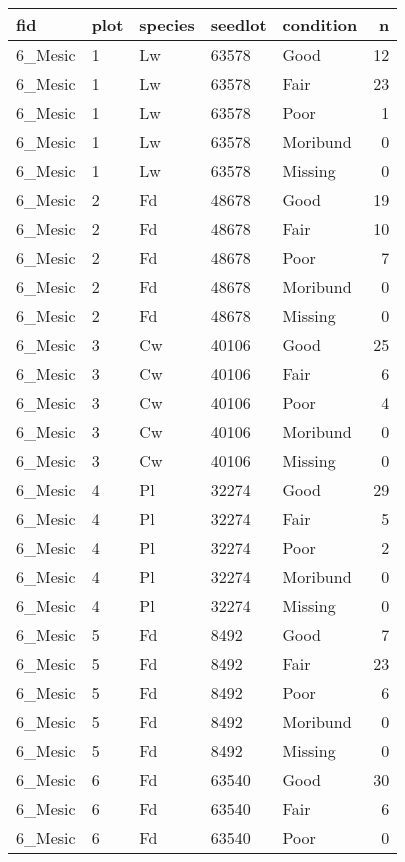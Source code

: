 \documentclass[
]{article}
\begin{document}
\begin{tabular}{l|l|l|l|l|r}
\hline
fid & plot & species & seedlot & condition & n\\
\hline
6\_Mesic & 1 & Lw & 63578 & Good & 12\\
\hline
6\_Mesic & 1 & Lw & 63578 & Fair & 23\\
\hline
6\_Mesic & 1 & Lw & 63578 & Poor & 1\\
\hline
6\_Mesic & 1 & Lw & 63578 & Moribund & 0\\
\hline
6\_Mesic & 1 & Lw & 63578 & Missing & 0\\
\hline
6\_Mesic & 2 & Fd & 48678 & Good & 19\\
\hline
6\_Mesic & 2 & Fd & 48678 & Fair & 10\\
\hline
6\_Mesic & 2 & Fd & 48678 & Poor & 7\\
\hline
6\_Mesic & 2 & Fd & 48678 & Moribund & 0\\
\hline
6\_Mesic & 2 & Fd & 48678 & Missing & 0\\
\hline
6\_Mesic & 3 & Cw & 40106 & Good & 25\\
\hline
6\_Mesic & 3 & Cw & 40106 & Fair & 6\\
\hline
6\_Mesic & 3 & Cw & 40106 & Poor & 4\\
\hline
6\_Mesic & 3 & Cw & 40106 & Moribund & 0\\
\hline
6\_Mesic & 3 & Cw & 40106 & Missing & 0\\
\hline
6\_Mesic & 4 & Pl & 32274 & Good & 29\\
\hline
6\_Mesic & 4 & Pl & 32274 & Fair & 5\\
\hline
6\_Mesic & 4 & Pl & 32274 & Poor & 2\\
\hline
6\_Mesic & 4 & Pl & 32274 & Moribund & 0\\
\hline
6\_Mesic & 4 & Pl & 32274 & Missing & 0\\
\hline
6\_Mesic & 5 & Fd & 8492 & Good & 7\\
\hline
6\_Mesic & 5 & Fd & 8492 & Fair & 23\\
\hline
6\_Mesic & 5 & Fd & 8492 & Poor & 6\\
\hline
6\_Mesic & 5 & Fd & 8492 & Moribund & 0\\
\hline
6\_Mesic & 5 & Fd & 8492 & Missing & 0\\
\hline
6\_Mesic & 6 & Fd & 63540 & Good & 30\\
\hline
6\_Mesic & 6 & Fd & 63540 & Fair & 6\\
\hline
6\_Mesic & 6 & Fd & 63540 & Poor & 0\\

\end{tabular}
\end{document}
